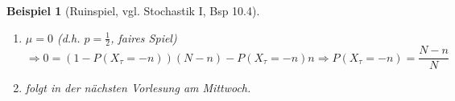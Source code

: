 \documentclass[a4paper,11pt]{book}
\newtheorem{Bsp}{Beispiel}[chapter]
\theoremstyle{nonumberplain}
\renewcommand{\indexname}{Stichwortverzeichnis}
\begin{document}
\begin{Bsp}[Ruinspiel, vgl. Stochastik I, Bsp 10.4]
\begin{enumerate}
\item[Fall 1:] $\mu = 0$ (d.h. $p = \frac12$, faires Spiel)
\[
\Rightarrow 0 = (1-P(X_{\tau} = -n))(N-n) - P(X_{\tau} = -n)n \Rightarrow P(X_{\tau} = -n) = \frac{N-n}{N}
\]

\item[Fall 2:] folgt in der nächsten Vorlesung am Mittwoch.
\end{enumerate}
\end{Bsp}

\newpage
\renewcommand{\indexname}{Stichwortverzeichnis}

\printindex
\end{document}
